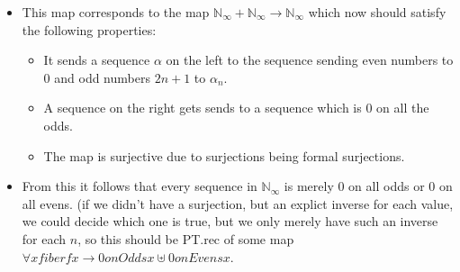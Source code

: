 \begin{itemize}
\begin{itemize}
\begin{itemize}
          \item By making a case distinction on x, we can prove that if x contains any  number n, we have that f(x) \geq f(\{n\
              ), which isn't zero, and therefore f(x) is also non-zero. So if f(x) = 0, then x doesn't contain any n, and thus must equal to empty set. 
        \end{itemize}
      \item This map corresponds to the map $\mathbb N_\infty + \mathbb N_\infty \to \mathbb N_\infty$ which  now should satisfy the following properties: 
        \begin{itemize}
          \item It sends a sequence $\alpha$ on the left to the sequence sending even numbers to 0 and odd numbers $2n+1$ to $\alpha_n$. 
          \item A sequence on the right gets sends to a sequence which is 0 on all the odds. 
          \item The map is surjective due to surjections being formal surjections. 
        \end{itemize}
      \item From this it follows that every sequence in $\mathbb N_\infty$ is merely 0 on all odds or 0 on all evens. 
        (if we didn't have a surjection, but an explict inverse for each value, we could decide which one is true, but we only merely have such an inverse for each $n$, so this should be PT.rec of some map $\forall x fiber f x \to 0onOdds x \uplus 0onEvens x$.
    \end{itemize}
\end{itemize}
